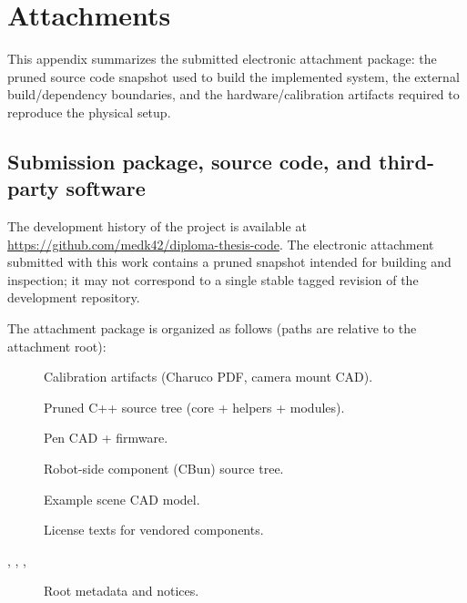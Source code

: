 \chapter{Attachments}
\label{appendix:attachments}

This appendix summarizes the submitted electronic attachment package: the pruned source code snapshot used to build the implemented system, the external build/dependency boundaries, and the hardware/calibration artifacts required to reproduce the physical setup.

\section{Submission package, source code, and third-party software}
\label{appendix:source_code}

The development history of the project is available at \url{https://github.com/medk42/diploma-thesis-code}.
The electronic attachment submitted with this work contains a pruned snapshot intended for building and inspection; it may not correspond to a single stable tagged revision of the development repository.

The attachment package is organized as follows (paths are relative to the attachment root):

\begin{description}
  \item[] Calibration artifacts (Charuco PDF, camera mount CAD).
  \item[] Pruned C++ source tree (core + helpers + modules).
  \item[] Pen CAD + firmware.
  \item[] Robot-side component (CBun) source tree.
  \item[] Example scene CAD model.
  \item[] License texts for vendored components.
  \item[, , , ] Root metadata and notices.
\end{description}

